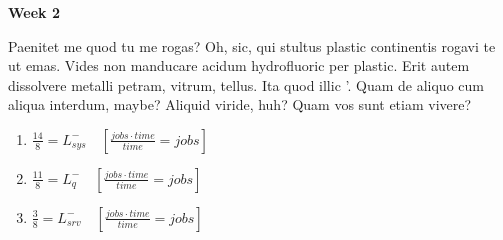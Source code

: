 \documentclass{article}
\def \listSpacing {28pt}
\begin{document}
\color{white}
\large

{\Large \noindent \textbf{Week 2}}

    \begin{multicols}{3}

    \noindent
    \begin{flushleft}
        Paenitet me quod tu me rogas? Oh, sic, qui stultus plastic continentis rogavi te ut emas. Vides non manducare acidum hydrofluoric per plastic. Erit autem dissolvere metalli petram, vitrum, tellus. Ita quod illic '. Quam de aliquo cum aliqua interdum, maybe? Aliquid viride, huh? Quam vos sunt etiam vivere?
    \end{flushleft}

    \columnbreak
        \centering

    \columnbreak

        \begin{enumerate}[label=\arabic*)]
            \setlength\itemsep{\listSpacing}
            \item \quad $ \frac{14}{8} = L^{-}_{sys} \quad [\frac{jobs \cdot time}{time} = jobs]$
            \item \quad $ \frac{11}{8} = L^{-}_{q} \quad [\frac{jobs \cdot time}{time} = jobs]$
            \item \quad $ \frac{3}{8} = L^{-}_{srv} \quad [\frac{jobs \cdot time}{time} = jobs]$
         \end{enumerate}

        \vspace*{\listSpacing}
    \end{multicols}
\end{document}
